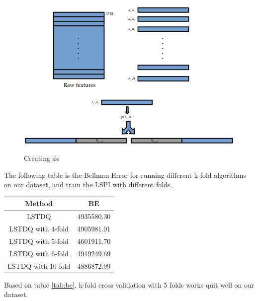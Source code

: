 \documentclass{article}
\theoremstyle{remark}
\begin{document}
\begin{figure}
  \centering
  \includegraphics[scale=.40]{phi.png}
  \caption{Creating $\phi$s}
  \label{fig:phi}
\end{figure}
The following table is the Bellman Error for running different k-fold algorithms on our dataset, and train the LSPI with different folds.



\begin{center} \label{tab:be}
\begin{tabular}{ |c|c| } 
 \hline
 Method & BE \\ 
 \hline
 LSTDQ & 4935580.30 \\ 
 LSTDQ with 4-fold & 4905981.01 \\ 
 LSTDQ with 5-fold & 4601911.70 \\ 
 LSTDQ with 6-fold & 4919249.69 \\ 
 LSTDQ with 10-fold& 4886872.99 \\
 \hline
\end{tabular}
\end{center}

Based on table \ref{tab:be}, k-fold cross validation with 5 folds works quit well on our dataset.




\end{document}
